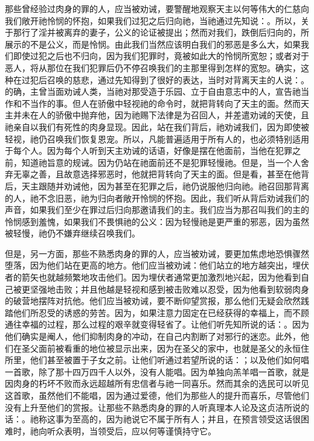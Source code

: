 那些曾经验过肉身的罪的人，应当被劝诫，要警醒地观察天主以何等伟大的仁慈向我们敞开祂怜悯的怀抱，如果我们过犯之后归向祂，当祂通过先知说：。所以，关于那行了淫并被离弃的妻子，公义的论证被提出；然而对我们，跌倒后归向的，所展示的不是公义，而是怜悯。由此我们当然应该明白我们的邪恶是多么大，如果我们即使过犯之后也不归向，因为我们犯罪时，竟被如此大的怜悯所宽恕；或者对于恶人，将从那位在我们犯罪后仍不停召唤我们的主那里得到怎样的宽恕。确实，这种在过犯后召唤的慈悲，通过先知得到了很好的表达，当时对背离天主的人说：。的确，主曾当面劝诫人类，当祂对那受造于乐园、立于自由意志中的人，宣告祂当作和不当作的事。但人在骄傲中轻视祂的命令时，就把背转向了天主的面。然而天主并未在人的骄傲中抛弃他，因为祂赐下法律是为召回人，并差遣劝诫的天使，且祂亲自以我们有死性的肉身显现。因此，站在我们背后，祂劝诫我们，因为即使被轻视，祂仍召唤我们恢复恩宠。所以，凡能普遍适用于所有人的，也必须特别适用于每个人。因为每个人听到天主劝诫的话语，好像是摆在他面前，当他在犯罪之前，知道祂旨意的规诫。因为仍站在祂面前还不是犯罪轻慢祂。但是，当一个人舍弃无辜之善，且故意选择邪恶时，他就把背转向了天主的面。但是看，甚至在他背后，天主跟随并劝诫他，因为甚至在犯罪之后，祂仍说服他归向祂。祂召回那背离的人，祂不念旧恶，祂为归向者敞开怜悯的怀抱。因此，我们听从背后劝诫我们的声音，如果我们至少在罪过后归向那邀请我们的主。我们应当为那召叫我们的主的怜悯感到羞愧，如果我们不畏惧祂的公义：因为轻慢祂是更严重的邪恶，因为虽然被轻慢，祂仍不嫌弃继续召唤我们。\par

但是，另一方面，那些不熟悉肉身的罪的人，应当被劝诫，要更加焦虑地恐惧骤然堕落，因为他们站在更高的地方。他们应当被劝诫：他们站立的地方越突出，埋伏者的箭矢也就越频繁地攻击他们。因为埋伏者通常更加激烈地兴起，因为他看到自己被更坚强地击败；并且他越是轻视和感到被击败难以忍受，因为他看到软弱肉身的破营地摆阵对抗他。他们应当被劝诫，要不断仰望赏报，那么他们无疑会欣然践踏他们所忍受的诱惑的劳苦。因为，如果注意力固定在已经获得的幸福上，而不顾通往幸福的过程，那么过程的艰辛就变得轻省了。让他们听先知所说的话：。因为他们确实是阉人，他们抑制肉身的冲动，在自己内割断了对邪行的迷恋。此外，他们在圣父面前被看重的地位被显示出来，因为在圣父的家中，也就是圣父的永恒住所里，他们甚至被置于子女之前。让他们听通过若望所说的话：；以及他们如何唱一首歌，除了那十四万四千人以外，没有人能唱。因为单独向羔羊唱一首歌，就是因肉身的朽坏不败而永远超越所有忠信者与祂一同喜乐。然而其余的选民可以听见这首歌，虽然他们不能唱，因为通过爱德，他们为那些人的提升而喜乐，尽管他们没有上升至他们的赏报。让那些不熟悉肉身的罪的人听真理本人论及这贞洁所说的话：。祂称这事为至高的，因为祂说它不属于所有人；并且，在预言领受这话很困难时，祂向听众表明，当领受后，应以何等谨慎持守它。\par

